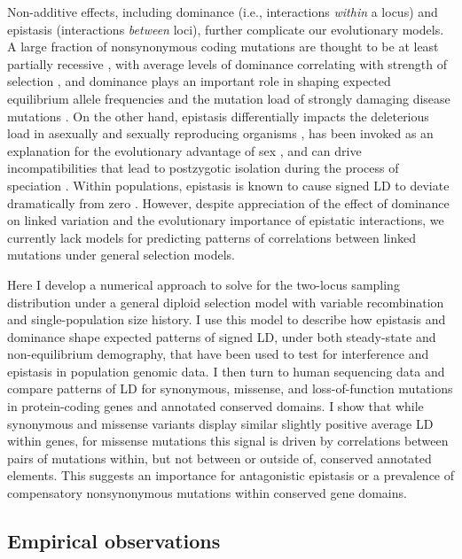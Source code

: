 \documentclass[]{article}
\begin{document}
Non-additive effects, including dominance (i.e., interactions \emph{within} a
locus) and epistasis (interactions \emph{between} loci), further complicate our
evolutionary models. A large fraction of nonsynonymous coding mutations are
thought to be at least partially recessive \citep{Agrawal2011-wb,
Huber2018-cp}, with average levels of dominance correlating with strength of
selection \citep{Kacser1981-nc}, and dominance plays an important role in
shaping expected equilibrium allele frequencies and the mutation load of
strongly damaging disease mutations \citep{Clark1998-kq}. On the other hand,
epistasis differentially impacts the deleterious load in asexually and sexually
reproducing organisms \citep{Kimura1966-gc,Kondrashov1995-va}, has been invoked
as an explanation for the evolutionary advantage of sex
\citep{Kondrashov1982-sf,Charlesworth1990-kw,Barton1998-lu}, and can drive
incompatibilities that lead to postzygotic isolation during the process of
speciation \citep{Turelli2000-kz}. Within populations, epistasis is known to
cause signed LD to deviate dramatically from zero \citep{Charlesworth1990-kw,
Kondrashov1995-va}. However, despite appreciation of the effect of dominance on
linked variation \citep{Turelli2000-kz, Zhao2016-bb} and the evolutionary
importance of epistatic interactions, we currently lack models for predicting
patterns of correlations between linked mutations under general selection
models.

Here I develop a numerical approach to solve for the two-locus
sampling distribution under a general diploid selection model with variable
recombination and single-population size history. I use this model to describe
how epistasis and dominance shape expected patterns of signed LD, under both
steady-state and non-equilibrium demography, that have been used to test for
interference and epistasis in population genomic data. I then turn to human
sequencing data and compare patterns of LD for synonymous, missense, and
loss-of-function mutations in protein-coding genes and annotated conserved
domains. I show that while synonymous and missense variants display similar
slightly positive average LD within genes, for missense mutations this signal
is driven by correlations between pairs of mutations within, but not between or
outside of, conserved annotated elements. This suggests an importance for
antagonistic epistasis or a prevalence of compensatory nonsynonymous mutations
within conserved gene domains.

\subsection{Empirical observations}\label{sec:empirical-observations}
\end{document}
